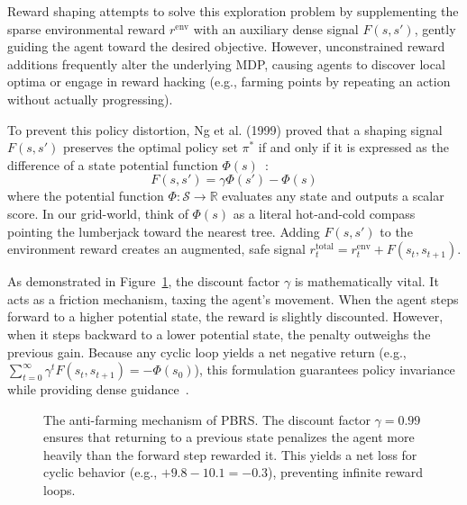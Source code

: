 Reward shaping attempts to solve this exploration problem by supplementing the sparse environmental reward $r^{\text{env}}$ with an auxiliary dense signal $F(s, s')$, gently guiding the agent toward the desired objective. However, unconstrained reward additions frequently alter the underlying MDP, causing agents to discover local optima or engage in reward hacking (e.g., farming points by repeating an action without actually progressing).

To prevent this policy distortion, Ng et al. (1999) proved that a shaping signal $F(s, s')$ preserves the optimal policy set $\pi^*$ if and only if it is expressed as the difference of a state potential function $\Phi(s)$~\parencite{Ng_Harada_Russell_1999}:
\begin{equation}
\label{eq:pbrs_canonical}
    F(s, s') = \gamma \Phi(s') - \Phi(s)
\end{equation}
where the potential function $\Phi: \mathcal{S} \rightarrow \mathbb{R}$ evaluates any state and outputs a scalar score. In our grid-world, think of $\Phi(s)$ as a literal hot-and-cold compass pointing the lumberjack toward the nearest tree. Adding $F(s, s')$ to the environment reward creates an augmented, safe signal $r^{\text{total}}_t = r_t^{\text{env}} + F(s_t, s_{t+1})$.

As demonstrated in Figure~\ref{fig:pbrs_loop}, the discount factor $\gamma$ is mathematically vital. It acts as a friction mechanism, taxing the agent's movement. When the agent steps forward to a higher potential state, the reward is slightly discounted. However, when it steps backward to a lower potential state, the penalty outweighs the previous gain. Because any cyclic loop yields a net negative return (e.g., $\sum_{t=0}^\infty \gamma^t F(s_t, s_{t+1}) = -\Phi(s_0)$), this formulation guarantees policy invariance while providing dense guidance~\parencite{Ng_Harada_Russell_1999}.

\begin{figure}[H]
\centering
{}
\caption{The anti-farming mechanism of PBRS. The discount factor $\gamma = 0.99$ ensures that returning to a previous state penalizes the agent more heavily than the forward step rewarded it. This yields a net loss for cyclic behavior (e.g., $+9.8 - 10.1 = -0.3$), preventing infinite reward loops.}
\label{fig:pbrs_loop}
\end{figure}

